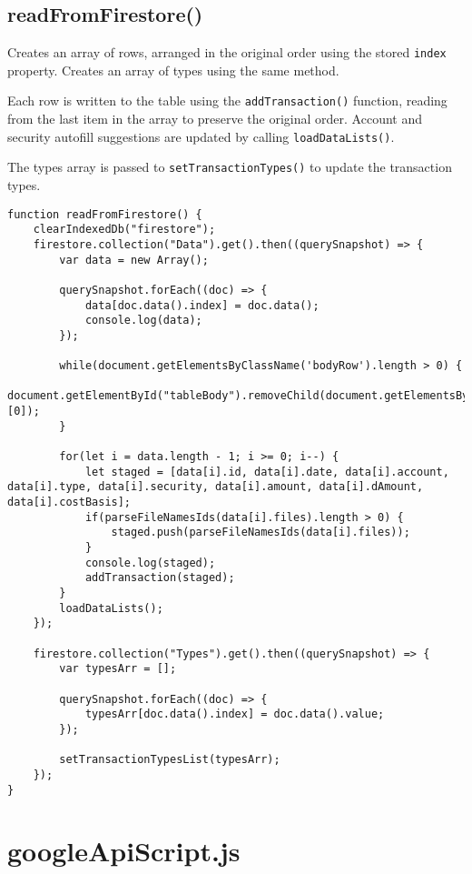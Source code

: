 \documentclass[letterpaper]{article}
\begin{document}
\subsection{readFromFirestore()}

Creates an array of rows, arranged in the original order using the stored \lstinline{index} property.
Creates an array of types using the same method.

Each row is written to the table using the \lstinline{addTransaction()} function, reading from the last item in the array to preserve the original order.
Account and security autofill suggestions are updated by calling \lstinline{loadDataLists()}.

The types array is passed to \lstinline{setTransactionTypes()} to update the transaction types.

\begin{lstlisting}[firstnumber=127]
function readFromFirestore() {
    clearIndexedDb("firestore");
    firestore.collection("Data").get().then((querySnapshot) => {
        var data = new Array();

        querySnapshot.forEach((doc) => {
            data[doc.data().index] = doc.data();
            console.log(data);
        });

        while(document.getElementsByClassName('bodyRow').length > 0) {
            document.getElementById("tableBody").removeChild(document.getElementsByClassName('bodyRow')[0]);
        }

        for(let i = data.length - 1; i >= 0; i--) {
            let staged = [data[i].id, data[i].date, data[i].account, data[i].type, data[i].security, data[i].amount, data[i].dAmount, data[i].costBasis];
            if(parseFileNamesIds(data[i].files).length > 0) {
                staged.push(parseFileNamesIds(data[i].files));
            }
            console.log(staged);
            addTransaction(staged);
        }
        loadDataLists();
    });

    firestore.collection("Types").get().then((querySnapshot) => {
        var typesArr = [];

        querySnapshot.forEach((doc) => {
            typesArr[doc.data().index] = doc.data().value;
        });

        setTransactionTypesList(typesArr);
    });
}
\end{lstlisting}

\newpage

\section{googleApiScript.js}
\end{document}
